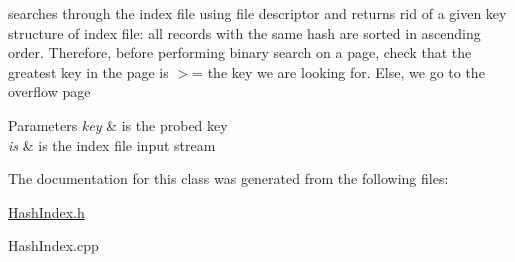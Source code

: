 searches through the index file using file descriptor and returns rid of a given key structure of index file\+: all records with the same hash are sorted in ascending order. Therefore, before performing binary search on a page, check that the greatest key in the page is $>$= the key we are looking for. Else, we go to the overflow page 


\begin{DoxyParams}{Parameters}
{\em key} & is the probed key \\
\hline
{\em is} & is the index file input stream \\
\hline
\end{DoxyParams}


The documentation for this class was generated from the following files\+:\begin{DoxyCompactItemize}
\item 
\hyperlink{_hash_index_8h}{Hash\+Index.\+h}\item 
Hash\+Index.\+cpp\end{DoxyCompactItemize}

